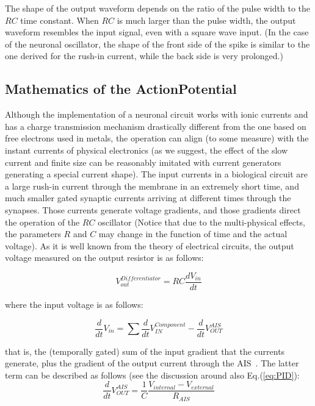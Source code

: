 The shape of the output waveform depends on the ratio of the pulse width to the $RC$ time constant. When $RC$ is much larger than the pulse width, the output waveform resembles the input signal, even with a square wave input. (In the case of the neuronal oscillator, the shape of the front side of the spike is similar to the one derived for the rush-in current, while the back side is very prolonged.)


\subsection{Mathematics of the ActionPotential\label{sec:MathematicsAP}}

Although the implementation of a neuronal circuit works with ionic
currents and has a charge transmission mechanism drastically different
from the one based on free electrons used in metals, the operation
can align (to some measure) with the instant currents of physical
electronics (as we suggest, the effect of the slow current and finite
size can be reasonably imitated with current generators generating
a special current shape). The input currents in a biological circuit
are a large rush-in current through the membrane in an extremely short
time, and much smaller gated synaptic currents arriving at different
times through the synapses. Those currents generate voltage gradients,
and those gradients direct the operation of the $RC$ oscillator
(Notice that due to the multi-physical effects, the parameters $R$ and $C$ may change in the function of time and the actual voltage).
As it is well known from the theory of electrical circuits, the output
voltage measured on the output resistor is as follows:

\begin{equation}
	V_{out}^{Differentiator}=RC\frac{dV_{in}}{dt}\label{eq:RC_Circuit_Output}
\end{equation}

\noindent where the input voltage is as follows:

\begin{equation}
	\frac{d}{dt}V_{in}=\sum\frac{d}{dt}V_{IN}^{Component}-\frac{d}{dt}V_{OUT}^{AIS}\label{eq:RC_Circuit_Input}
\end{equation}

\noindent that is, the (temporally gated) sum of the input gradient
that the currents generate, plus the gradient of the output current
through the \gls{AIS}~\cite{AISStructureReview:2018,AIS_Updated_Viewpoint:2018}.
The latter term can be described as follows (see the discussion around also Eq.(\ref{eq:PID}):
\begin{equation}
	\frac{d}{dt}V_{OUT}^{AIS}={\frac{1}{C}}\frac{V_{internal}-V_{external}}{R_{AIS}}\label{eq:AIS_Voltage}
\end{equation}

